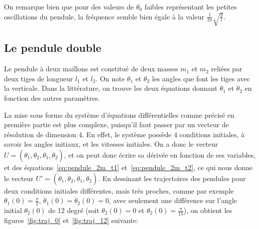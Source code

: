 \bigskip

On remarque bien que pour des valeurs de $ \theta_0 $ faibles représentant les petites oscillations du pendule, 
la fréquence semble bien égale à la valeur $ \frac{1}{2 \pi} \sqrt{\frac{g}{l}} $.

\subsection{Le pendule double}
Le pendule à deux maillons est constitué de deux masses $ m_1 $ et $ m_2 $ 
reliées par deux tiges de longueur $ l_1 $ et $ l _2 $. On note $ \theta_1 $ et $ \theta_2 $ les angles
que font les tiges avec la verticale. Dans la littérature, on trouve les deux équations donnant $\ddot \theta_1$ et $\ddot \theta_2$ en fonction des autres paramètres.

La mise sous forme du système d'équations différentielles comme précisé en première partie est plus complexe,
puisqu'il faut passer par un vecteur de résolution de dimension $4$.
En effet, le système possède $4$ conditions initiales, à savoir les angles initiaux, et les vitesses initiales.
On a donc le vecteur $ U = (\theta_1, \theta_2, \dot \theta_1, \dot \theta_2) $, et on peut donc écrire sa dérivée en fonction de ses variables, et des équations~\ref{eq:pendule_2m_t1} et~\ref{eq:pendule_2m_t2},
ce qui nous donne le vecteur $ U' = (\dot \theta_1, \dot \theta_2, \ddot \theta_1, \ddot \theta_2) $.
\medbreak
En dessinant les trajectoires des pendules pour deux conditions initiales différentes, mais très proches, comme par exemple 
$ \theta_1(0) = \frac{\pi}{2} $, $ \dot \theta_1(0) = \dot \theta_2(0) = 0 $, avec seulement une différence sur l'angle initial $ \theta_2(0) $ de 12 degré (soit $ \theta_2(0) = 0 $ et $ \theta_2(0) = \frac{\pi}{15} $),
on obtient les figures~\ref{fig:traj_0} et~\ref{fig:traj_12} suivante:

